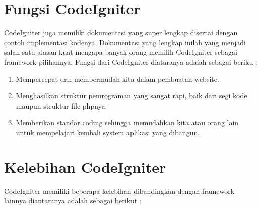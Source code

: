 \section{Fungsi CodeIgniter}
CodeIgniter juga memiliki dokumentasi yang super lengkap disertai dengan contoh implementasi kodenya. Dokumentasi yang lengkap inilah yang menjadi salah satu alasan kuat mengapa banyak orang memilih CodeIgniter sebagai framework pilihannya. Fungsi dari CodeIgniter diataranya adalah sebagai beriku :

\begin{enumerate}
\item Mempercepat dan mempermudah kita dalam pembuatan website.
\item Menghasilkan struktur pemrograman yang sangat rapi, baik dari segi kode maupun struktur file phpnya.
\item Memberikan standar coding sehingga memudahkan kita atau orang lain untuk mempelajari kembali system aplikasi yang dibangun.
\end{enumerate}  

\section{Kelebihan CodeIgniter}
CodeIgniter memiliki beberapa kelebihan dibandingkan dengan framework lainnya diantaranya adalah sebagai berikut :

